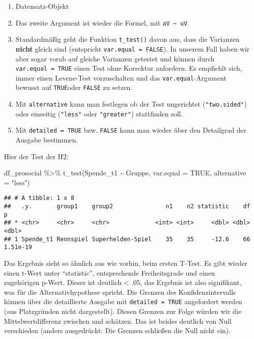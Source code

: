 \documentclass[
]{book}
\newenvironment{Shaded}{\begin{snugshade}}{\end{snugshade}}
\newcommand{\AttributeTok}[1]{\textcolor[rgb]{0.77,0.63,0.00}{#1}}
\newcommand{\ConstantTok}[1]{\textcolor[rgb]{0.00,0.00,0.00}{#1}}
\newcommand{\FunctionTok}[1]{\textcolor[rgb]{0.00,0.00,0.00}{#1}}
\newcommand{\NormalTok}[1]{#1}
\newcommand{\SpecialCharTok}[1]{\textcolor[rgb]{0.00,0.00,0.00}{#1}}
\newcommand{\StringTok}[1]{\textcolor[rgb]{0.31,0.60,0.02}{#1}}
\begin{document}
\begin{enumerate}
\def\labelenumi{\arabic{enumi}.}
\item
  Datensatz-Objekt
\item
  Das zweite Argument ist wieder die Formel, mit \texttt{aV\ \textasciitilde{}\ uV}.
\item
  Standardmäßig geht die Funktion \texttt{t\_test()} davon aus, dass die Varianzen \textbf{nicht} gleich sind (entspricht \texttt{var.equal\ =\ FALSE}). In unserem Fall haben wir aber sogar vorab auf gleiche Varianzen getestet und können durch \texttt{var.equal\ =\ TRUE} einen Test ohne Korrektur anfordern. Es empfiehlt sich, immer einen Levene-Test vorzuschalten und das \texttt{var.equal}-Argument bewusst auf \texttt{TRUE}oder \texttt{FALSE} zu setzen.
\item
  Mit \texttt{alternative} kann man festlegen ob der Test ungerichtet (\texttt{"two.sided"}) oder einseitig (\texttt{"less"} oder \texttt{"greater"}) stattfinden soll.
\item
  Mit \texttt{detailed\ =\ TRUE} bzw. \texttt{FALSE} kann man wieder über den Detailgrad der Ausgabe bestimmen.
\end{enumerate}

Hier der Test der H2:

\begin{Shaded}
\begin{Highlighting}[]
\NormalTok{df\_prosocial }\SpecialCharTok{\%\textgreater{}\%} 
  \FunctionTok{t\_test}\NormalTok{(Spende\_t1 }\SpecialCharTok{\textasciitilde{}}\NormalTok{ Gruppe, }\AttributeTok{var.equal =} \ConstantTok{TRUE}\NormalTok{, }\AttributeTok{alternative =} \StringTok{"less"}\NormalTok{) }
\end{Highlighting}
\end{Shaded}

\begin{verbatim}
## # A tibble: 1 x 8
##   .y.       group1    group2               n1    n2 statistic    df        p
## * <chr>     <chr>     <chr>             <int> <int>     <dbl> <dbl>    <dbl>
## 1 Spende_t1 Rennspiel Superhelden-Spiel    35    35     -12.6    66 1.51e-19
\end{verbatim}

Das Ergebnis sieht so ähnlich aus wie vorhin, beim ersten T-Test. Es gibt wieder einen t-Wert unter ``statistic'', entsprechende Freiheitsgrade und einen zugehörigen p-Wert. Dieser ist deutlich \textless{} .05, das Ergebnis ist also signifikant, was für die Alternativhypothese spricht. Die Grenzen des Konfidenzintervalls können über die detaillierte Ausgabe mit \texttt{detailed\ =\ TRUE} angefordert werden (aus Platzgründen nicht dargestellt). Diesen Grenzen zur Folge würden wir die Mittelwertdifferenz zwischen  und  schätzen. Das ist beides deutlich von Null verschieden (anders ausgedrückt: Die Grenzen schließen die Null nicht ein).
\end{document}
